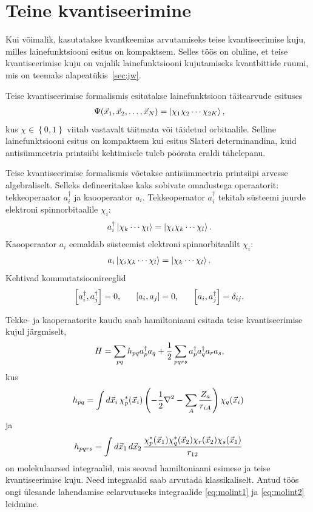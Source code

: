 \documentclass[12pt]{report}
\def\paren#1{\left(#1\right)}
\def\sparen#1{\left[#1\right]}
\def\cparen#1{\left\{#1\right\}}
\def\d#1{\mathinner{d#1}}
\def\ket#1{\left|#1\right>}
\begin{document}
\section{Teine kvantiseerimine}\label{sec:secquant}

Kui võimalik, kasutatakse kvantkeemias arvutamiseks teise kvantiseerimise kuju, milles lainefunktsiooni esitus on kompaktsem.
Selles töös on oluline, et teise kvantiseerimise kuju on vajalik lainefunktsiooni kujutamiseks kvantbittide ruumi, mis on teemaks alapeatükis~\ref{sec:jw}.

Teise kvantiseerimise formalismis esitatakse lainefunktsioon täitearvude esituses
\begin{align}
    \Psi(\vec{x}_1, \vec{x}_2, \ldots, \vec{x}_N) =
    \ket{\chi_1 \chi_2 \cdots \chi_{2K}} \rlap{,}
\end{align}
kus \(\chi \in \cparen{0, 1}\) viitab vastavalt täitmata või täidetud orbitaalile.
Selline lainefunktsiooni esitus on kompaktsem kui esitus Slateri determinandina, kuid antisümmeetria printsiibi kehtimisele tuleb pöörata eraldi tähelepanu.

Teise kvantiseerimise formalismis võetakse antisümmeetria printsiipi arvesse algebraliselt.
Selleks defineeritakse kaks sobivate omadustega operaatorit: tekkeoperaator \(a_i^\dagger\) ja kaooperaator \(a_i\).
Tekkeoperaator \(a_i^\dagger\) tekitab süsteemi juurde elektroni spinnorbitaalile \(\chi_i\):
\begin{align}
    a_i^\dagger \ket{\chi_k \cdots \chi_l} = \ket{\chi_i \chi_k \cdots \chi_l} \rlap{.}
\end{align}
Kaooperaator \(a_i\) eemaldab süsteemist elektroni spinnorbitaalilt \(\chi_i\):
\begin{align}
    a_i \ket{\chi_i \chi_k \cdots \chi_l} = \ket{\chi_k \cdots \chi_l}\rlap{.}
\end{align}
Kehtivad kommutatsioonireeglid
\begin{align}\label{eq:comrules}
    \sparen{a_i^\dagger, a_j^\dagger} = 0 \rlap{,}
    \qquad \sparen{a_i, a_j} = 0 \rlap{,}
    \qquad \sparen{a_i, a_j^\dagger} = \delta_{ij} \rlap{.}
\end{align}

Tekke- ja kaoperaatorite kaudu saab hamiltoniaani esitada teise kvantiseerimise kujul järgmiselt,
\begin{align}
    H = \sum_{pq}h_{pq}a_p^\dagger a_q
    + \frac{1}{2} \sum_{pqrs} a_p^\dagger a_q^\dagger a_r a_s \rlap{,}
\end{align}
kus
\begin{align}\label{eq:molint1}
    h_{pq} = \int\d{\vec{x}_i} \chi_p^*(\vec{x}_i)
    \paren{-\frac{1}{2} \nabla^2 - \sum_A \frac{Z_a}{r_{iA}}} \chi_q(\vec{x}_i)
\end{align}
ja
\begin{align}\label{eq:molint2}
    h_{pqrs} = \int \d{\vec{x}_1} \d{\vec{x}_2}
    \frac{\chi_p^*(\vec{x}_1) \chi_q^*(\vec{x}_2) \chi_r(\vec{x}_2) \chi_s(\vec{x}_1)}{r_{12}}
\end{align}
on molekulaarsed integraalid, mis seovad hamiltoniaani esimese ja teise kvantiseerimise kuju.
Need integraalid saab arvutada klassikaliselt.
Antud töös ongi ülesande lahendamise eelarvutuseks integraalide \eqref{eq:molint1} ja \eqref{eq:molint2} leidmine.
\end{document}
